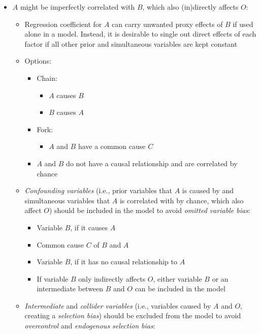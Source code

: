 \begin{itemize}
    \begin{itemize}
        \item $A$ might be imperfectly correlated with $B$, which also (in)directly affects $O$:
        \begin{itemize}
            \item Regression coefficient for $A$ can carry unwanted proxy effects of $B$ if used alone in a model. Instead, it is desirable to single out direct effects of each factor if all other prior and simultaneous variables are kept constant
            \item Options:
            \begin{itemize}
                \item Chain:
                \begin{itemize}
                    \item $A$ causes $B$
                    \item $B$ causes $A$
                \end{itemize}
                \item Fork:
                \begin{itemize}
                    \item $A$ and $B$ have a common cause $C$
                \end{itemize}
                \item $A$ and $B$ do not have a causal relationship and are correlated by chance
            \end{itemize}
            \item \emph{Confounding variables} (i.e., prior variables that $A$ is caused by and simultaneous variables that $A$ is correlated with by chance, which also affect $O$) should be included in the model to avoid \emph{omitted variable bias}:
            \begin{itemize}
                \item Variable $B$, if it causes $A$
                \item Common cause $C$ of $B$ and $A$
                \item Variable $B$, if it has no causal relationship to $A$
                \item If variable $B$ only indirectly affects $O$, either variable $B$ or an intermediate between $B$ and $O$ can be included in the model
            \end{itemize}
            \item \emph{Intermediate} and \emph{collider variables} (i.e., variables caused by $A$ and $O$, creating a \emph{selection bias}) should be excluded from the model to avoid \emph{overcontrol} and \emph{endogenous selection bias}:

\end{itemize}
\end{itemize}
\end{itemize}
